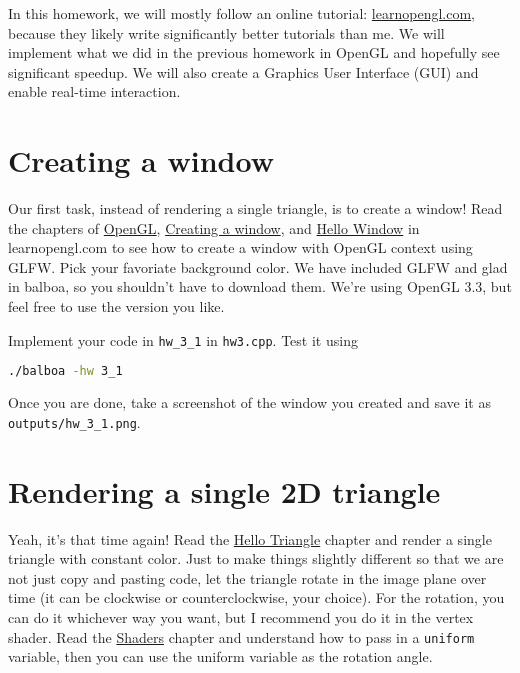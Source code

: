 In this homework, we will mostly follow an online tutorial: \href{https://learnopengl.com/}{learnopengl.com}, because they likely write significantly better tutorials than me. We will implement what we did in the previous homework in OpenGL and hopefully see significant speedup. We will also create a Graphics User Interface (GUI) and enable real-time interaction.

\section{Creating a window}

Our first task, instead of rendering a single triangle, is to create a window! Read the chapters of \href{https://learnopengl.com/Getting-started/OpenGL}{OpenGL}, \href{https://learnopengl.com/Getting-started/Creating-a-window}{Creating a window}, and \href{https://learnopengl.com/Getting-started/Hello-Window}{Hello Window} in learnopengl.com to see how to create a window with OpenGL context using GLFW. Pick your favoriate background color. We have included GLFW and glad in balboa, so you shouldn't have to download them. We're using OpenGL 3.3, but feel free to use the version you like.

Implement your code in \lstinline{hw_3_1} in \lstinline{hw3.cpp}. Test it using
\begin{lstlisting}[language=bash]
./balboa -hw 3_1
\end{lstlisting}

Once you are done, take a screenshot of the window you created and save it as \lstinline{outputs/hw_3_1.png}.

\section{Rendering a single 2D triangle}

Yeah, it's that time again! Read the \href{https://learnopengl.com/Getting-started/Hello-Triangle}{Hello Triangle} chapter and render a single triangle with constant color. Just to make things slightly different so that we are not just copy and pasting code, let the triangle rotate in the image plane over time (it can be clockwise or counterclockwise, your choice). For the rotation, you can do it whichever way you want, but I recommend you do it in the vertex shader. Read the \href{https://learnopengl.com/Getting-started/Shaders}{Shaders} chapter and understand how to pass in a \lstinline{uniform} variable, then you can use the uniform variable as the rotation angle.  

